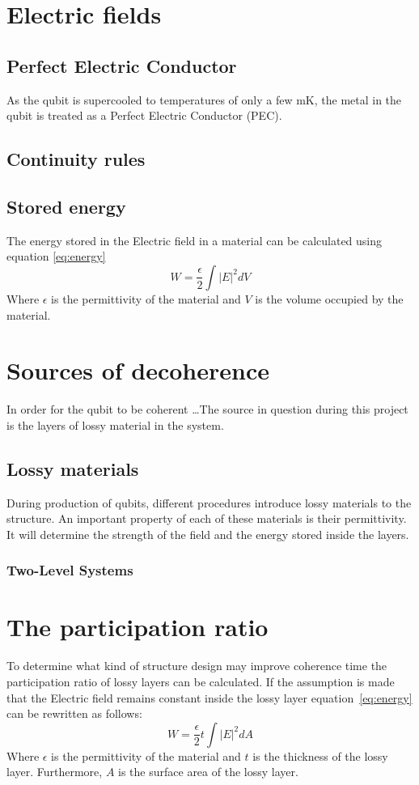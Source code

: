 \section{Electric fields}
\subsection{Perfect Electric Conductor}
As the qubit is supercooled to temperatures of only a few mK, the metal in the qubit is treated as a Perfect Electric Conductor (PEC).
\subsection{Continuity rules}
\subsection{Stored energy}
The energy stored in the Electric field in a material can be calculated using equation \eqref{eq:energy}
\begin{equation} \label{eq:energy}
	W = \frac{\epsilon}{2}\int{|E|}^{2}dV
\end{equation}
Where \(\epsilon\) is the permittivity of the material and \(V\) is the volume occupied by the material.

\section{Sources of decoherence}
In order for the qubit to be coherent \ldots The source in question during this project is the layers of lossy material in the system.
\subsection{Lossy materials}
During production of qubits, different procedures introduce lossy materials to the structure. An important property of each of these materials is their permittivity. It will determine the strength of the field and the energy stored inside the layers.
\subsubsection{Two-Level Systems}

\section{The participation ratio}
To determine what kind of structure design may improve coherence time the participation ratio of lossy layers can be calculated. If the assumption is made that the Electric field remains constant inside the lossy layer equation~\eqref{eq:energy} can be rewritten as follows:
\begin{equation}\label{eq:energy_layer}
W = \frac{\epsilon}{2}t\int{|E|}^{2}dA
\end{equation}
Where \(\epsilon\) is the permittivity of the material and \(t\) is the thickness of the lossy layer. Furthermore, \(A\) is the surface area of the lossy layer.


